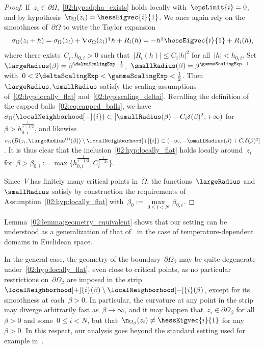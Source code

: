\begin{proof}
            If~$z_i\in\partial\Omega$,~\eqref{02:hyp:alpha_exists} holds locally with~$\epsLimit{i}=0$, and by hypothesis~$\n_\Omega(z_i) = \hessEigvec{i}{1}$. We once again rely on the smoothness of~$\partial \Omega$ to write the Taylor expansion
            \[\sigma_{\Omega}(z_i+h) = \sigma_{\Omega}(z_i) + \nabla\sigma_{\Omega}(z_i)^\intercal h + R_i(h) = -h^\intercal\hessEigvec{i}{1} + R_i(h),\]
            where there exists~$C_i,h_{0,i}>0$ such that~$|R_i(h)| \leq C_i|h|^2$ for all~$|h|<h_{0,i}$. Set~$\largeRadius(\beta) = \beta^{\deltaScalingExp-\frac12}$,~$\smallRadius(\beta)=\beta^{\gammaScalingExp-1}$ with~$0<2\deltaScalingExp < \gammaScalingExp < \frac12$. Then~$\largeRadius,\smallRadius$ satisfy the scaling assumptions of~\eqref{02:hyp:locally_flat} and~\eqref{02:hyp:scaling_deltai}.
            Recalling the definition of the capped balls~\eqref{02:eq:capped_balls}, we have~$\sigma_\Omega(\localNeighborhood[-]{i}) \subset [\smallRadius(\beta) - C_i\delta(\beta)^2,+\infty)$ for $\beta>h_{0,i}^{\frac1{s-1/2}}$, and likewise~$\sigma_\Omega(B(z_i,\largeRadius^{(i)}(\beta))\setminus\localNeighborhood[+]{i}) \subset (-\infty,-\smallRadius(\beta) +C_i\delta(\beta)^2]$. It is thus clear that the inclusion~\eqref{02:hyp:locally_flat} holds locally around~$z_i$ for~$\beta>\beta_{0,i} := \max\{h_{0,i}^{\frac1{s-1/2}},C_i^{\frac1{t-2s}}\}$.
            
            Since~$V$ has finitely many critical points in~$\overline{\Omega}$, the functions~$\largeRadius$ and~$\smallRadius$ satisfy by construction the requirements of Assumption~\eqref{02:hyp:locally_flat} with~$\beta_0 := \underset{0\leq i < N}{\max}\,\beta_{0,i}$.

    \end{proof}
    Lemma~\ref{02:lemma:geometry_equivalent} shows that our setting can be understood as a generalization of that of~\cite{LPN21} in the case of temperature-dependent domains in Euclidean space.

    \begin{remark}        
        In the general case, the geometry of the boundary~$\partial\Omega_\beta$ may be quite degenerate under~\eqref{02:hyp:locally_flat}, even close to critical points, as no particular restrictions on~$\partial\Omega_\beta$ are imposed in the strip~$\localNeighborhood[+]{i}(\beta)\setminus\localNeighborhood[-]{i}(\beta)$, except for its smoothness at each~$\beta>0$. In particular, the curvature at any point in the strip may diverge arbitrarily fast as~$\beta\to\infty$, and it may happen that~$z_i\in\partial\Omega_\beta$ for all~$\beta>0$ and some~$0\leq i < N$, but that~$\n_{\Omega_\beta}(z_i)\neq \hessEigvec{i}{1}$ for any~$\beta>0$.
        In this respect, our analysis goes beyond the standard setting used for example in~\cite{LPN21}.
    \end{remark}

